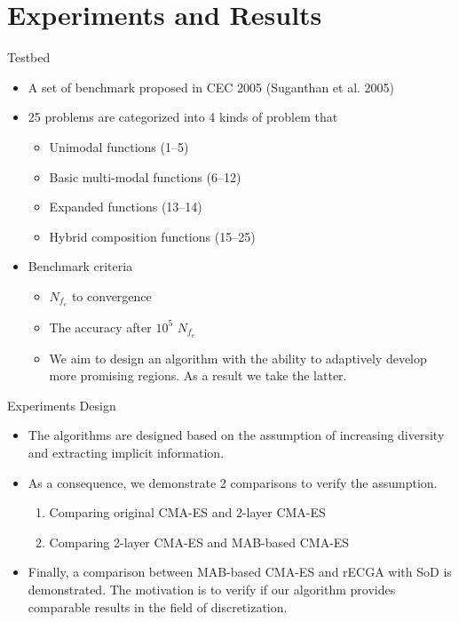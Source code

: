 \section{Experiments and Results}

\begin{frame}{Testbed}
  \begin{itemize}
    \item A set of benchmark proposed in CEC 2005 (Suganthan et al. 2005) 
      \vspace*{14pt}
    \item 25 problems are categorized into 4 kinds of problem that
      \begin{itemize}
        \item Unimodal functions (1--5)
        \item Basic multi-modal functions (6--12)
        \item Expanded functions (13--14)
        \item Hybrid composition functions (15--25)
      \end{itemize}
      \vspace*{14pt}
    \item Benchmark criteria
      \begin{itemize}
        \item $N_{f_e}$ to convergence
        \item The accuracy after $10^5$ $N_{f_e}$ 
        \item We aim to design an algorithm with the ability to adaptively
          develop more promising regions. As a result we take the latter.
      \end{itemize}
  \end{itemize}
\end{frame}

\begin{frame}{Experiments Design}
  \begin{itemize}
    \item The algorithms are designed based on the assumption of
      increasing diversity and extracting implicit information.
      \vspace*{14pt}
    \item As a consequence, we demonstrate 2 comparisons to verify the
      assumption.
      \begin{enumerate}
        \item Comparing original CMA-ES and  2-layer CMA-ES
        \item Comparing 2-layer CMA-ES and MAB-based CMA-ES
      \end{enumerate}
      \vspace*{14pt}
    \item Finally, a comparison between MAB-based CMA-ES and rECGA with
      SoD is demonstrated. The motivation is to verify if our algorithm
      provides comparable results in the field of discretization.
  \end{itemize}
\end{frame}

